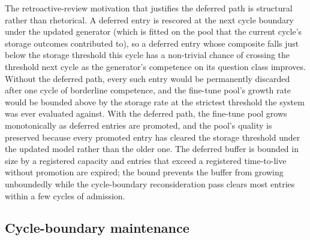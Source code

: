 The retroactive-review motivation that justifies the deferred path is structural rather than rhetorical. A deferred entry is rescored at the next cycle boundary under the updated generator (which is fitted on the pool that the current cycle's storage outcomes contributed to), so a deferred entry whose composite falls just below the storage threshold this cycle has a non-trivial chance of crossing the threshold next cycle as the generator's competence on its question class improves. Without the deferred path, every such entry would be permanently discarded after one cycle of borderline competence, and the fine-tune pool's growth rate would be bounded above by the storage rate at the strictest threshold the system was ever evaluated against. With the deferred path, the fine-tune pool grows monotonically as deferred entries are promoted, and the pool's quality is preserved because every promoted entry has cleared the storage threshold under the updated model rather than the older one. The deferred buffer is bounded in size by a registered capacity and entries that exceed a registered time-to-live without promotion are expired; the bound prevents the buffer from growing unboundedly while the cycle-boundary reconsideration pass clears most entries within a few cycles of admission.

\subsection{Cycle-boundary maintenance}
\label{sec:cycle-boundary}

